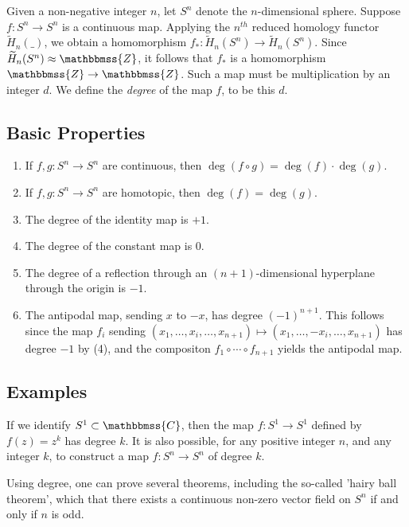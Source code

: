 \documentclass[12pt]{article}
\newcommand{\Z}{\mathbbmss{Z}}
\newcommand{\mathbb}[1]{\mathbbmss{#1}}
\begin{document}
Given a non-negative integer $n$, let $S^n$ denote the $n$-dimensional sphere. Suppose $f\colon S^n \to S^n$ is a continuous map. Applying the $n^{th}$ reduced homology functor $\widetilde{H}_n(\_)$, we obtain a homomorphism $f_*\colon \widetilde{H}_n(S^n) \to \widetilde{H}_n(S^n)$. Since $\widetilde{H}_n(S^n) \approx \Z$, it follows that $f_*$ is a homomorphism $\Z \to \Z$. Such a map must be multiplication by an integer $d$. We define the \emph{degree} of the map $f$, to be this $d$.

\subsection{Basic Properties}
\begin{enumerate}
\item If $f,g\colon S^n \to S^n$ are continuous, then $\deg(f \circ g) = \deg(f)\cdot\deg(g)$.
\item If $f,g\colon S^n \to S^n$ are homotopic, then $\deg(f) = \deg(g)$.
\item The degree of the identity map is $+1$.
\item The degree of the constant map is $0$.
\item The degree of a reflection through an $(n+1)$-dimensional hyperplane through the origin is $-1$.
\item The antipodal map, sending $x$ to $-x$, has degree $(-1)^{n+1}$. This follows since the map $f_i$ sending $(x_1,\ldots,x_i,\ldots,x_{n+1}) \mapsto (x_1,\ldots,-x_i,\ldots,x_{n+1})$ has degree $-1$ by (4), and the compositon $f_1\circ\cdots\circ f_{n+1}$ yields the antipodal map.
\end{enumerate}

\subsection{Examples}
If we identify $S^1 \subset \mathbb{C}$, then the map $f : S^1 \to S^1$ defined by $f(z) = z^k$ has degree $k$. It is also possible, for any positive integer $n$, and any integer $k$, to construct a map $f\colon S^n \to S^n$ of degree $k$.

Using degree, one can prove several theorems, including the so-called 'hairy ball theorem', which  that there exists a continuous non-zero vector field on $S^n$ if and only if $n$ is odd.
\end{document}
